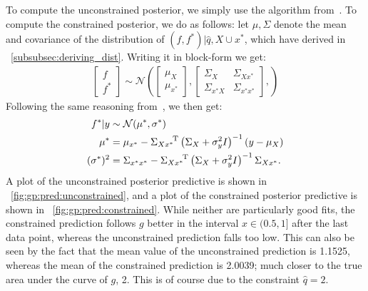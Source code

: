 To compute the unconstrained posterior, we simply use the
algorithm from~\cite[40]{krause2022notes}.
To compute the constrained posterior, we do as follows:
let $\mu, \Sigma$ denote the mean and covariance of the distribution of
$(f, f^\ast) | \hat{q}, X \cup x^\ast$, which have derived in ~\cref{subsubsec:deriving_dist}.
Writing it in block-form we get:
\begin{align*}
  \left[ \begin{array}{c} f \\ \hline f^\ast \end{array}  \right]
  \sim
  \mathcal{N}\left(
    \left[ \begin{array}{c} \mu_X \\ \hline \mu_{x^\ast} \end{array}  \right],
    \left[ \begin{array}{c|c}
      \Sigma_X & \Sigma_{X x^\ast} \\ \hline
      \Sigma_{x^\ast X} & \Sigma_{x^\ast x^\ast}
    \end{array}  \right],
  \right)
\end{align*}
Following the same reasoning from~\cite{krause2022notes},
we then get:
\begin{align*}
  f^\ast | y
  &\sim \mathcal{N}(\mu^\ast, \sigma^\ast)
  \\
  \mu^\ast
  &= \mu_{x^\ast} - {\Sigma_{X x^\ast}}^{\!\text{T}} \left(
    \Sigma_{X} + \sigma_y^2 I
  \right)^{-1} (y - \mu_{X})
  \\
  (\sigma^\ast)^2
  &= \Sigma_{x^\ast x^\ast} - {\Sigma_{X x^\ast}}^{\!\text{T}} \left(
    \Sigma_{X} + \sigma_y^2 I
  \right)^{-1} \Sigma_{X x^\ast}.
\end{align*}
%
A plot of the unconstrained posterior predictive is shown in%
~\cref{fig:gp:pred:unconstrained},
and a plot of the constrained posterior predictive is shown in%
~\cref{fig:gp:pred:constrained}.
%
While neither are particularly good fits,
the constrained prediction follows $g$ better in the interval
$x \in (0.5, 1]$ after the last data point, whereas the
unconstrained prediction falls too low.
%
This can also be seen by the fact that the mean value
of the unconstrained prediction is 1.1525,
whereas the mean of the constrained prediction is 2.0039;
much closer to the true area under the curve of $g$, 2.
This is of course due to the constraint $\hat{q} = 2$.
